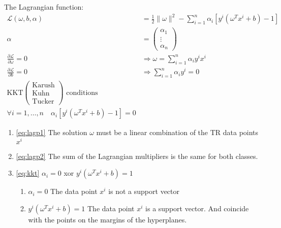 The Lagrangian function:
\begin{align*}
	\mathscr{L}(\omega, b, \alpha)                   & = \frac{1}{2}\lVert\omega\rVert^2 - \sum_{i=1}^n \alpha_i \left[ y^i(\omega^Tx^i + b) - 1 \right] \\
	\alpha                                           & = \begin{pmatrix} \alpha_1 \\ \vdots \\ \alpha_n \end{pmatrix}
	\tag{Lagrangian multiplier}                                                                                                                          \\
	\frac{\partial \mathscr{L}}{\partial \omega} = 0 & \Rightarrow \omega = \sum_{i=1}^n \alpha_i y^i x^i \tag{p1}\label{eq:lagp1}                       \\
	\frac{\partial \mathscr{L}}{\partial b} = 0      & \Rightarrow \sum_{i=1}^n \alpha_i y^i = 0 \tag{p2}\label{eq:lagp2}                                \\
	\text{KKT} \begin{pmatrix}
		           \text{Karush} \\
		           \text{Kuhn}   \\
		           \text{Tucker}
	           \end{pmatrix} \text{ conditions}                                                                                                          \\
	\forall i=1,\dots,n \quad \alpha_i \left[ y^i(\omega^Tx^i + b) - 1 \right] = 0 \tag{kkt}\label{eq:kkt}
\end{align*}

\begin{enumerate}
	\item \ref{eq:lagp1} \textrightarrow{} The solution $\omega$ must be a linear combination of the TR data points $x^i$
	\item \ref{eq:lagp2} \textrightarrow{} The sum of the Lagrangian multipliers is the same for both classes.
	\item \ref{eq:kkt} \textrightarrow{} $\alpha_i = 0$  xor $y^i(\omega^Tx^i + b) = 1$
	      \begin{enumerate}
		      \item $\alpha_i = 0$ \textrightarrow{} The data point $x^i$ is not a support vector
		      \item $y^i(\omega^Tx^i + b) = 1$ \textrightarrow{} The data point $x^i$ is a support vector. And coincide with the points on the margins of the hyperplanes.
	      \end{enumerate}
\end{enumerate}

